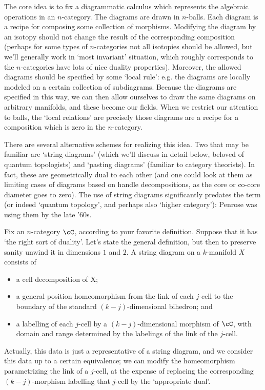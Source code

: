 \documentclass[11pt]{amsart}
\theoremstyle{plain}
\begin{document}
The core idea is to fix a diagrammatic calculus which represents the algebraic operations in an $n$-category. The diagrams are drawn in $n$-balls. Each diagram is a recipe for composing some collection of morphisms. Modifying the diagram by an isotopy should not change the result of the corresponding composition (perhaps for some types of $n$-categories not all isotopies should be allowed, but we'll generally work in `most invariant' situation, which roughly corresponds to the $n$-categories have lots of nice duality properties). Moreover, the allowed diagrams should be specified by some `local rule': e.g. the diagrams are locally modeled on a certain collection of subdiagrams. Because the diagrams are specified in this way, we can then allow ourselves to draw the same diagrams on arbitrary manifolds, and these become our fields. When we restrict our attention to balls, the `local relations' are precisely those diagrams are a recipe for a composition which is zero in the $n$-category.

There are several alternative schemes for realizing this idea. Two that may be familiar are `string diagrams' (which we'll discuss in detail below, beloved of quantum topologists) and `pasting diagrams' (familiar to category theorists). In fact, these are geometrically dual to each other (and one could look at them as limiting cases of diagrams based on handle decompositions, as the core or co-core diameter goes to zero). The use of string diagrams significantly predates the term (or indeed `quantum topology', and perhaps also `higher category'): Penrose was using them by the late '60s.

Fix an $n$-category $\cC$, according to your favorite definition. Suppose that it has `the right sort of duality'. Let's state the general definition, but then to preserve sanity unwind it in dimensions $1$ and $2$.
A string diagram on a $k$-manifold $X$ consists of
\begin{itemize}
\item a cell decomposition of X;
\item a general position homeomorphism from the link of each $j$-cell to the boundary of the standard $(k-j)$-dimensional bihedron; and
\item a labelling of each $j$-cell by a $(k-j)$-dimensional morphism of $\cC$, with domain and range determined by the labelings of the link of the $j$-cell.
\end{itemize}
Actually, this data is just a representative of a string diagram, and we consider this data up to a certain equivalence; we can modify the homeomorphism parametrizing the link of a $j$-cell, at the expense of replacing the corresponding $(k-j)$-morphism labelling that $j$-cell by the `appropriate dual'.
\end{document}
